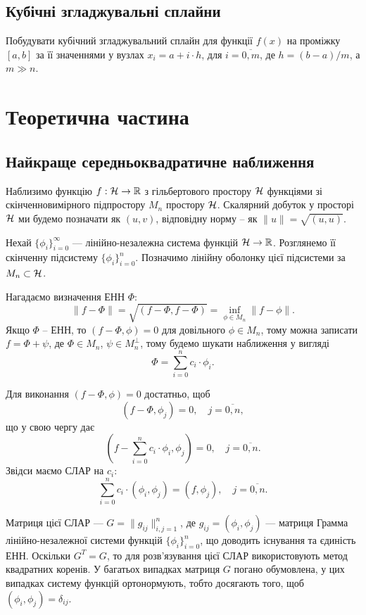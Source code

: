 \subsection{Кубічні згладжувальні сплайни}

Побудувати кубічний згладжувальний  сплайн для функції $f(x)$ на проміжку $[a, b]$ за її значеннями у вузлах $x_i = a + i \cdot h$, для $i = \overline{0, m}$, де $h = (b - a) / m$, а $m \gg n$.

\section{Теоретична частина}

\subsection{Найкраще середньоквадратичне наближення}

Наблизимо функцію $f: \mathcal{H} \to \mathbb{R}$ з гільбертового простору $\mathcal{H}$ функціями зі скінченновимірного підпростору $M_n$ простору $\mathcal{H}$. Скалярний добуток у просторі $\mathcal{H}$ ми будемо позначати як $(u, v)$, відповідну норму -- як $\|u\| = \sqrt{(u, u)}$. \medskip

Нехай $\{\phi_i\}_{i=0}^\infty$ --- лінійно-незалежна система функцій $\mathcal{H} \to \mathbb{R}$. Розглянемо її скінченну підсистему $\{\phi_i\}_{i=0}^n$. Позначимо лінійну оболонку цієї підсистеми за $M_n \subset \mathcal{H}$. \medskip

Нагадаємо визначення ЕНН $\Phi$: \[ \|f - \Phi\| = \sqrt{(f - \Phi, f - \Phi)} = \inf_{\phi \in M_n} \|f - \phi\|. \] Якщо $\Phi$ -- ЕНН, то $(f - \Phi, \phi) = 0$ для довільного $\phi \in M_n$, тому можна записати $f = \Phi + \psi$, де $\Phi \in M_n$, $\psi \in M_n^\perp$, тому будемо шукати наближення у вигляді \[ \Phi = \sum_{i = 0}^n c_i \cdot \phi_i. \]

Для виконання $(f - \Phi, \phi) = 0$ достатньо, щоб \[ (f - \Phi, \phi_j) = 0, \quad j = \overline{0, n}, \] що у свою чергу дає \[ \left(f - \sum_{i = 0}^n c_i \cdot \phi_i, \phi_j \right) = 0, \quad j = \overline{0, n}. \] Звідси маємо СЛАР на $c_i$: \[ \sum_{i=0}^n c_i \cdot (\phi_i, \phi_j) = (f, \phi_j), \quad j = \overline{0, n}. \]

Матриця цієї СЛАР --- $G = \|g_{ij}\|_{i,j=1}^{n}$, де $g_{ij} = (\phi_i, \phi_j)$ --- матриця Грамма лінійно-незалежної системи функцій $\{\phi_i\}_{i=0}^n$, що доводить існування та єдиність ЕНН. Оскільки $G^T = G$, то для розв'язування цієї СЛАР використовують метод квадратних коренів. У багатьох випадках матриця $G$ погано обумовлена, у цих випадках систему функцій ортонормують, тобто досягають того, щоб $(\phi_i, \phi_j) = \delta_{ij}$. \medskip

